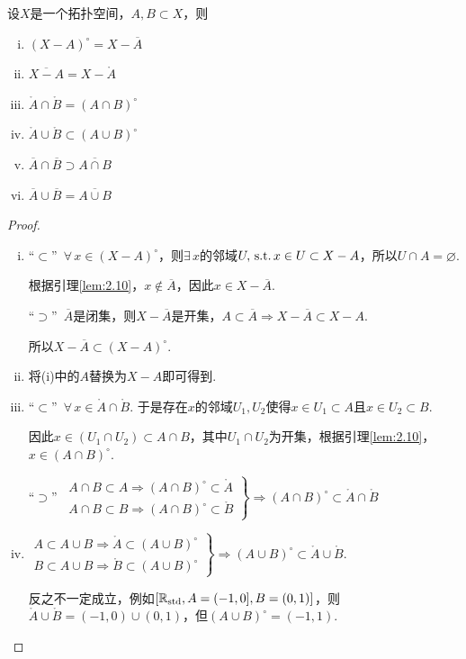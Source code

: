 \vspace{5 em}
\begin{proposition}
    设$X$是一个拓扑空间，$A,B\subset X$，则
    \begin{enumerate}[(i)]
        \item ${(X-A)}^{\circ} = X-\overline{A}$
        \item $\overline{X-A} = X-\mathring{A}$
        \item $\mathring{A}\cap\mathring{B} = {(A\cap B)}^{\circ}$
        \item $\mathring{A}\cup\mathring{B} \subset {(A\cup B)}^{\circ}$
        \item $\overline{A}\cap\overline{B} \supset \overline{A\cap B}$
        \item $\overline{A}\cup\overline{B} = \overline{A\cup B}$
    \end{enumerate}
\end{proposition}
\begin{proof}
    \begin{enumerate}[(i)]
        \item “$\subset$”\, $\forall\, x\in (X-A)^\circ$，则$\exists\, x$的邻域$U,\operatorname{\,\text{s.t.}} x\in U\subset X-A$，所以$U\cap A=\varnothing$.\par
        根据引理\ref{lem:2.10}，$x\notin\overline{A}$，因此$x\in X-\overline{A}$.\par
        “$\supset$”\, $\overline{A}$是闭集，则$X-\overline{A}$是开集，$A\subset\overline{A}\Rightarrow X-\overline{A}\subset X-A$.\par
        所以$X-\overline{A}\subset (X-A)^\circ$.
        \item 将(i)中的$A$替换为$X-A$即可得到.
        \item “$\subset$”\, $\forall\,x\in\mathring{A}\cap\mathring{B}$. 于是存在$x$的邻域$U_1, U_2$使得$x\in U_1\subset A$且$x\in U_2\subset B$.\par
        因此$x\in (U_1\cap U_2)\subset A\cap B$，其中$U_1\cap U_2$为开集，根据引理\ref{lem:2.10}，$x\in{(A\cap B)}^\circ$.\par
        “$\supset$”\, $\left.\begin{array}{lll}
            A\cap B\subset A \Rightarrow {(A\cap B)}^\circ \subset\mathring{A} \\
            A\cap B\subset B \Rightarrow {(A\cap B)}^\circ \subset\mathring{B}
        \end{array}\right\}\Rightarrow (A\cap B)^\circ\subset \mathring{A}\cap\mathring{B}$
        \item $\left.\begin{array}{lll}
            A\subset A\cup B \Rightarrow \mathring{A}\subset{(A\cup B)^\circ} \\
            B\subset A\cup B \Rightarrow \mathring{B}\subset{(A\cup B)}^\circ
        \end{array}\right\}\Rightarrow (A\cup B)^\circ\subset \mathring{A}\cup\mathring{B}$.\par
        反之不一定成立，例如$[\mathbb{R}_\mathrm{std},A=(-1,0],B=(0,1)]$，则$\mathring{A}\cup\mathring{B}=(-1,0)\cup(0,1)$，但$(A\cup B)^\circ=(-1,1)$.
    \end{enumerate}
\end{proof}

